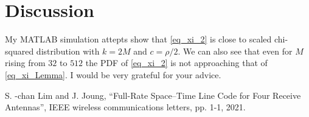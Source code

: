 \documentclass{article}
\begin{document}
\section{Discussion}

My MATLAB simulation attepts show that \eqref{eq_xi_2} is close to scaled chi-squared distribution with $k=2M$ and $c = \rho/2$. We can also see that even for $M$ rising from $32$ to $512$ the PDF of \eqref{eq_xi_2} is not approaching that of \eqref{eq_xi_Lemma}. 
I would be very grateful for your advice.


\begin{thebibliography}{00}

 S. -chan Lim and J. Joung, “Full-Rate Space–Time Line Code for Four Receive Antennas”, IEEE wireless communications letters, pp. 1-1, 2021.

\end{thebibliography}
\end{document}
